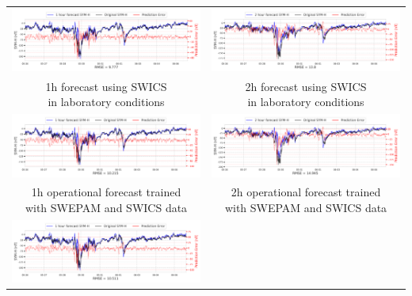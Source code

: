\documentclass[draft,sw]{agutexSI2019}
\begin{document}
\begin{table}
\centering
\begin{tabular}{cc}
\includegraphics[width=0.49\linewidth]{paper_plots_shade/1h_swics/1h_swics_storm_34.png}
&
\includegraphics[width=0.49\linewidth]{paper_plots_shade/2h_swics/2h_swics_storm_34.png}
\\
\shortstack{1h forecast using SWICS\\ in laboratory conditions} & \shortstack{2h forecast using SWICS\\ in laboratory conditions}
\vspace*{12pt}
\\
\includegraphics[width=0.49\linewidth]{paper_plots_shade/1h_swics_rt/1h_swics_rt_storm_34.png}
&
\includegraphics[width=0.49\linewidth]{paper_plots_shade/2h_swics_rt/2h_swics_rt_storm_34.png}
\\
\shortstack{1h operational forecast trained\\ with SWEPAM and SWICS data} & \shortstack{2h operational forecast trained\\ with SWEPAM and SWICS data}
\vspace*{12pt}
\\
\includegraphics[width=0.49\linewidth]{paper_plots_shade/1h_swepam_rt/1h_swepam_rt_storm_34.png}

\end{tabular}
\end{table}
\end{document}
